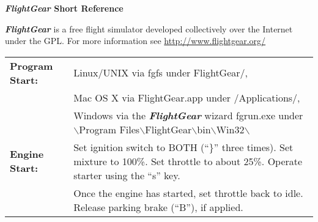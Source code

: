 \documentclass[10pt]{article}
\newcommand{\FlightGear}{{\itshape\bfseries FlightGear}}
\newcommand{\web}[1]{\href{#1}{#1}}
\newcommand{\longpage}{\enlargethispage{\baselineskip}}
\begin{document}
\longpage

\centerline{\large \textbf{\FlightGear{} Short Reference}}
\medskip

\scriptsize \noindent
 \FlightGear{} is a free flight simulator developed collectively over the
 Internet under the GPL.  For more information see  \web{http://www.flightgear.org/}\\

\hspace*{-8mm}
\begin{tabular}{ll}
\textbf{Program Start:}  & Linux/UNIX via fgfs under FlightGear/,\\
                         & Mac OS X via FlightGear.app under /Applications/,\\
                         & Windows via the \FlightGear{} wizard fgrun.exe under
         $\backslash$Program Files$\backslash$FlightGear$\backslash$bin$\backslash$Win32$\backslash$\\

\textbf{Engine Start:}   & Set ignition switch to BOTH (``\}'' three times). Set mixture to 100\%.
                           Set throttle to about 25\%. Operate starter using the ``s'' key. \\
                         & Once the engine has started, set throttle back to idle.
                           Release parking brake (``B''), if applied.
\end{tabular}
\medskip
\end{document}
